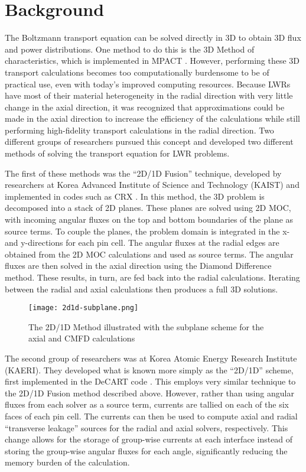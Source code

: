 \section{Background}

The Boltzmann transport equation can be solved directly in 3D to obtain 3D flux and power distributions.  One method to do this is the 3D Method of characteristics, which is implemented in MPACT \cite{KochunasThesis}.  However, performing these 3D transport calculations becomes too computationally burdensome to be of practical use, even with today's improved computing resources.  Because LWRs have most of their material heterogeneity in the radial direction with very little change in the axial direction, it was recognized that approximations could be made in the axial direction to increase the efficiency of the calculations while still performing high-fidelity transport calculations in the radial direction.  Two different groups of researchers pursued this concept and developed two different methods of solving the transport equation for LWR problems.

The first of these methods was the ``2D/1D Fusion'' technique, developed by researchers at Korea Advanced Institute of Science and Technology (KAIST) and implemented in codes such as CRX \cite{Fusion2D1D,FusionMOC,cho2015CRX2d1dFusionDecusping}.  In this method, the 3D problem is decomposed into a stack of 2D planes.  These planes are solved using 2D MOC, with incoming angular fluxes on the top and bottom boundaries of the plane as source terms.  To couple the planes, the problem domain is integrated in the x- and y-directions for each pin cell.  The angular fluxes at the radial edges are obtained from the 2D MOC calculations and used as source terms.  The angular fluxes are then solved in the axial direction using the Diamond Difference method.  These results, in turn, are fed back into the radial calculations.  Iterating between the radial and axial calculations then produces a full 3D solutions.

\begin{figure}[h]
    \centering
    \texttt{[image: 2d1d-subplane.png]}
    \caption[2D/1D Illustration]{The 2D/1D Method illustrated with the subplane scheme for the axial and CMFD calculations}
    \label{f:2d1dsubpalne}
\end{figure}

The second group of researchers was at Korea Atomic Energy Research Institute (KAERI).  They developed what is known more simply as the ``2D/1D'' scheme, first implemented in the DeCART code \cite{3DHetWholeCoreTransPlanarMOC,DeCARTTheoryManual,MethodsAndPerformanceOfDecart}.  This employs very similar technique to the 2D/1D Fusion method described above.  However, rather than using angular fluxes from each solver as a source term, currents are tallied on each of the six faces of each pin cell.  The currents can then be used to compute axial and radial ``transverse leakage'' sources for the radial and axial solvers, respectively.  This change allows for the storage of group-wise currents at each interface instead of storing the group-wise angular fluxes for each angle, significantly reducing the memory burden of the calculation.

